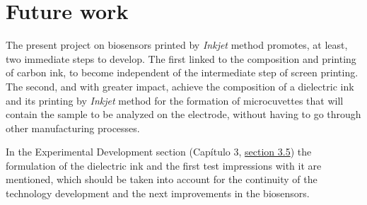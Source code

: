 \section{Future work}
The present project on biosensors printed by \textit{Inkjet} method promotes, at least, two immediate steps to develop. The first linked to the composition and printing of carbon ink, to become independent of the intermediate step of screen printing. The second, and with greater impact, achieve the composition of a dielectric ink and its printing by \textit{Inkjet} method for the formation of microcuvettes that will contain the sample to be analyzed on the electrode, without having to go through other manufacturing processes.

In the Experimental Development section (Capítulo 3, \hyperref[sec:tinta_dielec]{section 3.5}) the formulation of the dielectric ink and the first test impressions with it are mentioned, which should be taken into account for the continuity of the technology development and the next improvements in the biosensors.

\nocite{Banica}
\nocite{Prudenziati}
\nocite{Voros}
\nocite{Poc}
\nocite{PosterPoc1}
\nocite{DMPDatasheet}
\nocite{AgParticlesDimatix1}
\nocite{AgParticlesDimatix2}